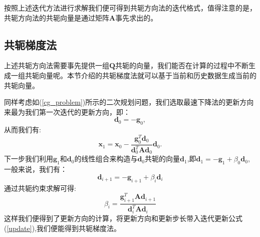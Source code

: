 \documentclass{ctexart}
\begin{document}
按照上述迭代方法进行求解我们便可得到共轭方向法的迭代格式，值得注意的是，共轭方向法的共轭向量是通过矩阵$\mathbf{A}$事先求出的。
\subsection{共轭梯度法}
上述共轭方向法需要事先提供一组$\mathbf{Q}$共轭的向量，我们能否在计算的过程中不断生成一组共轭向量呢。本节介绍的共轭梯度法就可以基于当前和历史数据生成当前的共轭向量。


同样考虑如(\ref{cg_problem})所示的二次规划问题，我们选取最速下降法的更新方向来最为我们第一次迭代的更新方向，即：
\begin{equation}
\mathbf{d}_0=-\mathbf{g}_0,
\end{equation}
从而我们有:
\begin{equation}
	\mathbf{x}_1=\mathbf{x}_0-\frac{\mathbf{g}_0^T\mathbf{d}_0}{\mathbf{d}_0^T\mathbf{Ad}_0}\mathbf{d}_0.
\end{equation}
下一步我们利用$\mathbf{g}_1$和$\mathbf{d}_0$的线性组合来构造与$\mathbf{d}_0$共轭的向量$\mathbf{d}_1$,即$\mathbf{d}_1=-\mathbf{g}_1+\beta_0\mathbf{d}_0$,一般来说，我们有：
\begin{equation}
\mathbf{d}_{i+1}=-\mathbf{g}_{i+1}+\beta_i\mathbf{d}_{i}
\end{equation}
通过共轭约束求解可得:
\begin{equation}
\beta_i=\frac{\mathbf{g}_{i+1}^T\mathbf{Ad}_{i+1}}{\mathbf{d}_{i}^T\mathbf{Ad}_{i}}
\end{equation}
这样我们便得到了更新方向的计算，将更新方向和更新步长带入迭代更新公式(\ref{update}),我们便能得到共轭梯度法。
\end{document}
